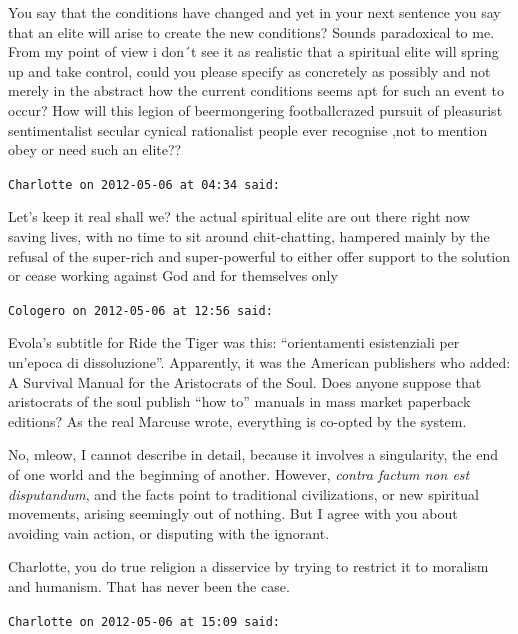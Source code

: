 \begin{footnotesize}
\begin{sffamily}
You say that the conditions have changed and yet in your next sentence you say that an elite will arise to create the new conditions? Sounds paradoxical to me. From my point of view i don´t see it as realistic that a spiritual elite will spring up and take control, could you please specify as concretely as possibly and not merely in the abstract how the current conditions seems apt for such an event to occur? How will this legion of beermongering footballcrazed pursuit of pleasurist sentimentalist secular cynical rationalist people ever recognise ,not to mention obey or need such an elite??

\hfill

\texttt{Charlotte on 2012-05-06 at 04:34 said:}

Let's keep it real shall we? the actual spiritual elite are out there right now saving lives, with no time to sit around chit-chatting, hampered mainly by the refusal of the super-rich and super-powerful to either offer support to the solution or cease working against God and for themselves only

\hfill

\texttt{Cologero on 2012-05-06 at 12:56 said:}

Evola's subtitle for Ride the Tiger was this: ``orientamenti esistenziali per un'epoca di dissoluzione''. Apparently, it was the American publishers who added: A Survival Manual for the Aristocrats of the Soul. Does anyone suppose that aristocrats of the soul publish ``how to'' manuals in mass market paperback editions? As the real Marcuse wrote, everything is co-opted by the system.

No, mleow, I cannot describe in detail, because it involves a singularity, the end of one world and the beginning of another. However, \emph{contra factum non est disputandum}, and the facts point to traditional civilizations, or new spiritual movements, arising seemingly out of nothing. But I agree with you about avoiding vain action, or disputing with the ignorant.

Charlotte, you do true religion a disservice by trying to restrict it to moralism and humanism. That has never been the case.

\hfill

\texttt{Charlotte on 2012-05-06 at 15:09 said:}


\end{sffamily}
\end{footnotesize}
